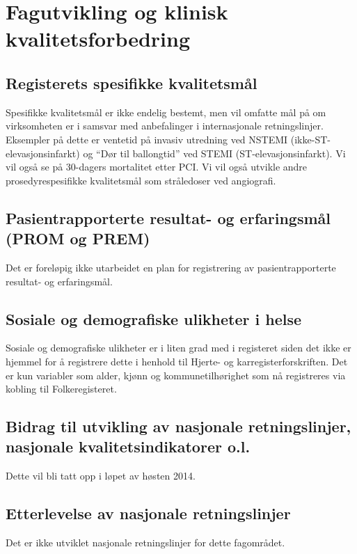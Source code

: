 \documentclass[norsk, a4paper]{report}
\begin{document}
\chapter{Fagutvikling og klinisk kvalitetsforbedring}\label{cha:fag}

\section{Registerets spesifikke kvalitetsmål}\label{sec:regspe}
Spesifikke kvalitetsmål er ikke endelig bestemt, men vil omfatte mål på om virksomheten er i samsvar med anbefalinger i internasjonale retningslinjer. Eksempler på dette er ventetid på invasiv utredning ved NSTEMI (ikke-ST-elevasjonsinfarkt) og ``Dør til ballongtid'' ved STEMI (ST-elevasjonsinfarkt). Vi vil også se på 30-dagers mortalitet etter PCI. Vi vil også utvikle andre prosedyrespesifikke kvalitetsmål som stråledoser ved angiografi.

\section{Pasientrapporterte resultat- og erfaringsmål (PROM og PREM)}\label{sec:pasutk}
Det er foreløpig ikke utarbeidet en plan for registrering av pasientrapporterte resultat- og erfaringsmål.

\section{Sosiale og demografiske ulikheter i helse}\label{sec:sosdem}
Sosiale og demografiske ulikheter er i liten grad med i registeret siden det ikke er hjemmel for å registrere dette i henhold til Hjerte- og karregisterforskriften. Det er kun variabler som alder, kjønn og kommunetilhørighet som nå registreres via kobling til Folkeregisteret.

\section{Bidrag til utvikling av nasjonale retningslinjer, nasjonale kvalitetsindikatorer o.l.}\label{sec:retut}
Dette vil bli tatt opp i løpet av høsten 2014.

\section{Etterlevelse av nasjonale retningslinjer}\label{sec:retbru}
Det er ikke utviklet nasjonale retningslinjer for dette fagområdet.
\end{document}
